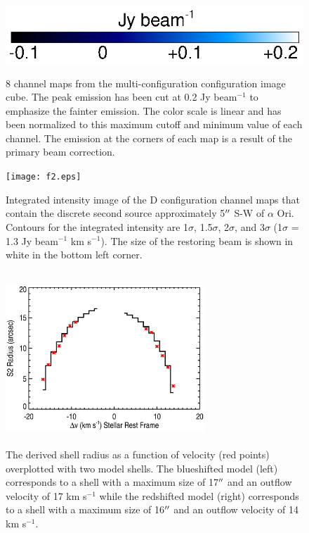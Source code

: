 \documentclass[preprint2]{aastex}
\begin{document}
\begin{figure}[hbt!]
{         }
\includegraphics[trim=0pt 20pt 180pt 10pt]{color_bar.ps}
\caption{8 channel maps from the multi-configuration configuration image cube. The peak emission has been cut at 0.2 Jy beam${{}^{-1}}$ to emphasize the fainter emission. The color scale is linear and has been normalized to this maximum cutoff and minimum value of each channel. The emission at the corners of each map is a result of the primary beam correction.}
\label{fig:fig3}
\end{figure}

\clearpage

\begin{figure}
\texttt{[image: f2.eps]}
\caption{Integrated intensity image of the D configuration channel maps that contain the discrete second source approximately 5$\mbox{$^{\prime\prime}$}$ S-W of $\alpha$ Ori. Contours for the integrated intensity are 1$\sigma$, 1.5$\sigma$, 2$\sigma$, and 3$\sigma$ (1$\sigma$ = 1.3 Jy beam${}^{-1}$ km s${}^{-1}$). The size of the restoring beam is shown in white in the bottom left corner.}
\label{fig:fig2}
\end{figure}

\clearpage

\begin{figure}
\includegraphics[trim=45pt 0pt 30pt 0pt, width=7.5cm, height=6.5cm]{s2_size.eps}
\caption{The derived shell radius as a function of velocity (red points) overplotted with two model shells. The blueshifted model (left) corresponds to a shell with a maximum size of 17$\mbox{$^{\prime\prime}$}$ and an outflow velocity of 17 km s${}^{-1}$ while the redshifted model (right) corresponds to a shell with a maximum size of 16$\mbox{$^{\prime\prime}$}$ and an outflow velocity of 14 km s${}^{-1}$.}
\label{fig:fig4}
\end{figure}
\end{document}
